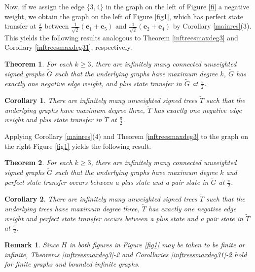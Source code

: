 \documentclass[12pt,a4paper]{article}
\newtheorem{thm}{Theorem}
\newtheorem{cor}{Corollary}
\newtheorem{rem}{Remark}
\def \e {{\bf e}}
\def \e {{\mathbf e}}
\begin{document}
Now, if we assign the edge $\{3,4\}$ in the graph on the left of Figure \ref{fi} a negative weight, we obtain the graph on the left of Figure \ref{fig1}, which has perfect state transfer at $\frac{\pi}{2}$ between $\frac{1}{\sqrt2}(\e_1+\e_5)$ and $\frac{1}{\sqrt2}(\e_2+\e_4)$ by Corollary \ref{mainres}(3). This yields the following results analogous to Theorem \ref{inftreesmaxdeg3} and Corollary \ref{inftreesmaxdeg31}, respectively. 

\begin{thm}
\label{infsignedplus}
For each $k\geq 3$, there are infinitely many connected unweighted signed graphs $\tilde{G}$ such that the underlying graphs have maximum degree $k$, $\tilde{G}$ has exactly one negative edge weight, and plus state transfer in $\tilde{G}$ at $\frac{\pi}{2}$.
\end{thm}

\begin{cor}
\label{treemaxdeg3}
There are infinitely many unweighted signed trees $\tilde{T}$ such that the underlying graphs have maximum degree three, $\tilde{T}$ has exactly one negative edge weight and plus state transfer in $\tilde{T}$ at $\frac{\pi}{2}$.
\end{cor}

Applying Corollary \ref{mainres}(4) and Theorem \ref{inftreesmaxdeg3} to the graph on the right Figure \ref{fig1} yields the following result.

\begin{thm}
\label{ak}
For each $k\geq 3$, there are infinitely many connected unweighted signed graphs $\tilde{G}$ such that the underlying graphs have maximum degree $k$ and perfect state transfer occurs between a plus state and a pair state in $\tilde{G}$ at $\frac{\pi}{2}$.
\end{thm}

\begin{cor}\label{3cor9}
There are infinitely many unweighted signed trees $\tilde{T}$ such that the underlying trees have maximum degree three, $\tilde{T}$ has exactly one negative edge weight and perfect state transfer occurs between a plus state and a pair state in $\tilde{T}$ at $\frac{\pi}{2}$.
\end{cor}

\begin{rem}
Since $H$ in both figures in Figure \ref{fig1} may be taken to be finite or infinite, Theorems \ref{inftreesmaxdeg3}-\ref{ak} and Corollaries \ref{inftreesmaxdeg31}-\ref{3cor9} hold for finite graphs and bounded infinite graphs.
\end{rem}
\end{document}

